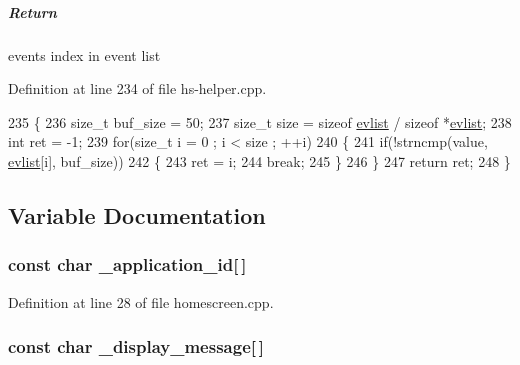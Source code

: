 \subparagraph*{Return}

event\textquotesingle{}s index in event list 

Definition at line 234 of file hs-\/helper.\+cpp.


\begin{DoxyCode}
235 \{
236     \textcolor{keywordtype}{size\_t} buf\_size = 50;
237     \textcolor{keywordtype}{size\_t} size = \textcolor{keyword}{sizeof} \hyperlink{hs-helper_8cpp_a0cd84b1a2184c9b84d1b7bf24582f28e}{evlist} / \textcolor{keyword}{sizeof} *\hyperlink{hs-helper_8cpp_a0cd84b1a2184c9b84d1b7bf24582f28e}{evlist};
238     \textcolor{keywordtype}{int} ret = -1;
239     \textcolor{keywordflow}{for}(\textcolor{keywordtype}{size\_t} i = 0 ; i < size ; ++i)
240     \{
241         \textcolor{keywordflow}{if}(!strncmp(value, \hyperlink{hs-helper_8cpp_a0cd84b1a2184c9b84d1b7bf24582f28e}{evlist}[i], buf\_size))
242         \{
243             ret = i;
244             \textcolor{keywordflow}{break};
245         \}
246     \}
247     \textcolor{keywordflow}{return} ret;
248 \}
\end{DoxyCode}


\subsection{Variable Documentation}
\subsubsection[{\texorpdfstring{\+\_\+application\+\_\+id}{_application_id}}]{\setlength{\rightskip}{0pt plus 5cm}const char \+\_\+application\+\_\+id\mbox{[}$\,$\mbox{]}}\hypertarget{hs-helper_8h_a6a0e1db2562b442f8131ddf64b61d1ba}{}\label{hs-helper_8h_a6a0e1db2562b442f8131ddf64b61d1ba}


Definition at line 28 of file homescreen.\+cpp.

\subsubsection[{\texorpdfstring{\+\_\+display\+\_\+message}{_display_message}}]{\setlength{\rightskip}{0pt plus 5cm}const char \+\_\+display\+\_\+message\mbox{[}$\,$\mbox{]}}\hypertarget{hs-helper_8h_abfd6c1d6f316fa952b11553f8f275e92}{}\label{hs-helper_8h_abfd6c1d6f316fa952b11553f8f275e92}


